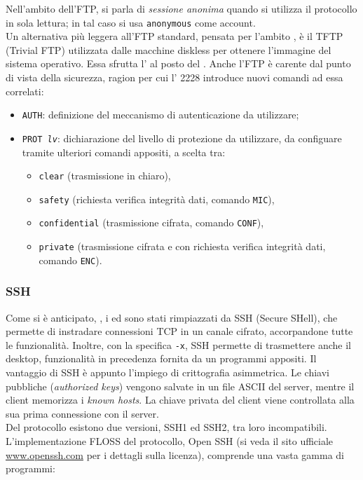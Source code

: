 \documentclass[a4paper,11pt]{article}
\def\code#1{\texttt{#1}}
\def\subsub#1{\subsubsection{#1}\label{#1}}
\def\vedi#1{\nameref{#1}}
\def\italic#1{\textit{#1}}
\begin{document}
Nell'ambito dell'FTP, si parla di \textit{sessione anonima} quando si utilizza il protocollo in sola lettura; in tal caso si usa \code{anonymous} come account.\\
Un alternativa più leggera all'FTP standard, pensata per l'ambito \vedi{LAN}, è il TFTP (Trivial FTP) utilizzata dalle macchine diskless per ottenere l'immagine del sistema operativo. Essa sfrutta l'\vedi{UDP} al posto del \vedi{TCP}. Anche l'FTP è carente dal punto di vista della sicurezza, ragion per cui l'\vedi{RFC} 2228 introduce nuovi comandi ad essa correlati:
\begin{itemize}
\item \code{AUTH}: definizione del meccanismo di autenticazione da utilizzare;
\item \code{PROT \italic{lv}}: dichiarazione del livello di protezione da utilizzare, da configuare tramite ulteriori comandi appositi, a scelta tra:
	\begin{itemize}
		\item \code{clear} (trasmissione in chiaro),
		\item \code{safety} (richiesta verifica integrità dati, comando \code{MIC}),
		\item \code{confidential} (trasmissione cifrata, comando \code{CONF}),
		\item \code{private} (trasmissione cifrata e con richiesta verifica integrità dati, comando \code{ENC}).
	\end{itemize}
\end{itemize}
\subsub{SSH}
Come si è anticipato, \vedi{Telnet}, i \vedi{Comandi r} ed  \vedi{FTP} sono stati rimpiazzati da SSH (Secure SHell), che permette di instradare connessioni TCP in un canale cifrato, accorpandone tutte le funzionalità. Inoltre, con la specifica \code{-x}, SSH permette di trasmettere anche il desktop, funzionalità in precedenza fornita da un programmi appositi. Il vantaggio di SSH è appunto l'impiego di crittografia asimmetrica. 
Le chiavi pubbliche (\textit{authorized keys}) vengono salvate in un file ASCII del server, mentre il client memorizza i \textit{known hosts}. La chiave privata del client viene controllata alla sua prima connessione con il server.\\ 
Del protocollo esistono due versioni, SSH1 ed SSH2, tra loro incompatibili.\\
L'implementazione FLOSS del protocollo, Open SSH (si veda il sito ufficiale \url{www.openssh.com} per i dettagli sulla licenza), comprende una vasta gamma di programmi:
\end{document}
